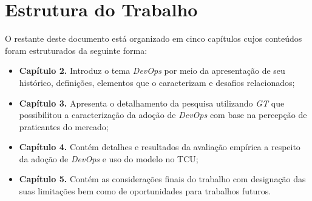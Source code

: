 \section{Estrutura do Trabalho}

O restante deste documento está organizado em cinco capítulos cujos conteúdos
foram estruturados da seguinte forma:

\begin{itemize}
\item \textbf{Capítulo 2.} Introduz o tema \textit{DevOps} por meio da
apresentação de seu histórico, definições, elementos que o caracterizam e
desafios relacionados;
\item \textbf{Capítulo 3.} Apresenta o detalhamento da pesquisa utilizando
\textit{\acrfull{GT}} que possibilitou a caracterização da adoção de
\textit{DevOps} com base na percepção de praticantes do mercado;
\item \textbf{Capítulo 4.} Contém detalhes e resultados da avaliação empírica
a respeito da adoção de {\it DevOps} e uso do modelo no \acrshort{TCU};
\item \textbf{Capítulo 5.} Contém as considerações finais do trabalho com
designação das suas limitações bem como de oportunidades para trabalhos futuros.
\end{itemize}




